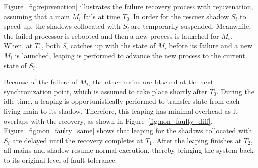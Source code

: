 

Figure~\ref{fig:rejuvenation} illustrates the failure recovery process with rejuvenation, assuming that a main $M_i$ fails at time $T_0$.
In order for the rescuer shadow $S_i$ to speed up, the shadows collocated with $S_i$ are temporarily suspended. %
Meanwhile, the failed processor is rebooted and then a new process is launched for $M_i$. When, at $T_1$, both $S_i$ catches up with the state of $M_i$ before its failure and a new $M_i$ is launched, leaping is performed to advance the new process to the current state of $S_i$. %

Because of the failure of $M_i$, the other mains are blocked at the next synchronization point, which is assumed to take place shortly after $T_0$. During the idle time, a leaping is opportunistically performed to transfer state from each living main to its shadow. Therefore, this leaping has minimal overhead as it overlaps with the recovery, as shown in Figure~\ref{fig:non_faulty_diff}. Figure~\ref{fig:non_faulty_same} shows that leaping for the shadows collocated with $S_i$ are delayed until the recovery completes at $T_1$. After the leaping finishes at $T_2$, all mains and shadow resume normal execution, thereby bringing the system back to its original level of fault tolerance.



